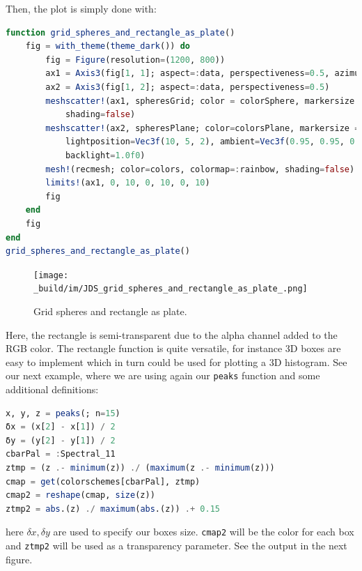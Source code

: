 \documentclass[
  notoc %
]{tufte-book}
\newcommand{\passthrough}[1]{#1}
\begin{document}
Then, the plot is simply done with:

\begin{lstlisting}[language=Julia]
function grid_spheres_and_rectangle_as_plate()
    fig = with_theme(theme_dark()) do
        fig = Figure(resolution=(1200, 800))
        ax1 = Axis3(fig[1, 1]; aspect=:data, perspectiveness=0.5, azimuth=0.72)
        ax2 = Axis3(fig[1, 2]; aspect=:data, perspectiveness=0.5)
        meshscatter!(ax1, spheresGrid; color = colorSphere, markersize = 1,
            shading=false)
        meshscatter!(ax2, spheresPlane; color=colorsPlane, markersize = 0.75,
            lightposition=Vec3f(10, 5, 2), ambient=Vec3f(0.95, 0.95, 0.95),
            backlight=1.0f0)
        mesh!(recmesh; color=colors, colormap=:rainbow, shading=false)
        limits!(ax1, 0, 10, 0, 10, 0, 10)
        fig
    end
    fig
end
grid_spheres_and_rectangle_as_plate()
\end{lstlisting}

\begin{figure}
\hypertarget{fig:grid_spheres_and_rectangle_as_plate}{%
\centering
\texttt{[image: \_build/im/JDS\_grid\_spheres\_and\_rectangle\_as\_plate\_.png]}
\caption{Grid spheres and rectangle as
plate.}\label{fig:grid_spheres_and_rectangle_as_plate}
}
\end{figure}

Here, the rectangle is semi-transparent due to the alpha channel added
to the RGB color. The rectangle function is quite versatile, for
instance 3D boxes are easy to implement which in turn could be used for
plotting a 3D histogram. See our next example, where we are using again
our \passthrough{\lstinline!peaks!} function and some additional
definitions:

\begin{lstlisting}[language=Julia]
x, y, z = peaks(; n=15)
δx = (x[2] - x[1]) / 2
δy = (y[2] - y[1]) / 2
cbarPal = :Spectral_11
ztmp = (z .- minimum(z)) ./ (maximum(z .- minimum(z)))
cmap = get(colorschemes[cbarPal], ztmp)
cmap2 = reshape(cmap, size(z))
ztmp2 = abs.(z) ./ maximum(abs.(z)) .+ 0.15
\end{lstlisting}

here \(\delta x, \delta y\) are used to specify our boxes size.
\passthrough{\lstinline!cmap2!} will be the color for each box and
\passthrough{\lstinline!ztmp2!} will be used as a transparency
parameter. See the output in the next figure.
\end{document}
